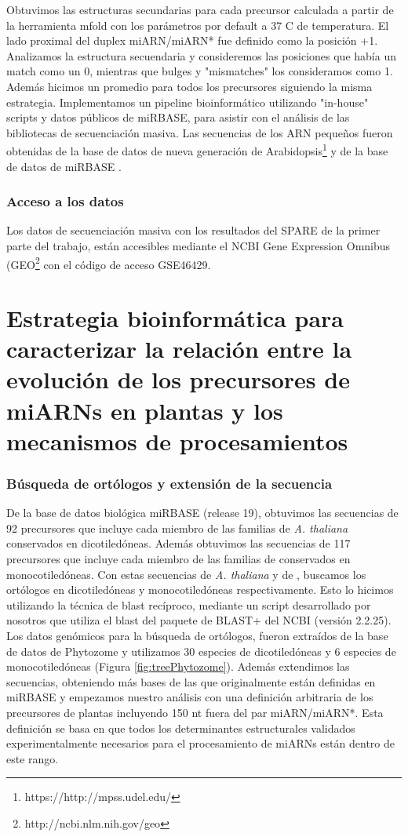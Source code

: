 Obtuvimos las estructuras secundarias para cada precursor calculada a partir de la herramienta mfold \citep{pmid12824337} con los parámetros por default a 37 \degree C de temperatura.
El lado proximal del duplex miARN/miARN* fue definido como la posición +1.
Analizamos la estructura secuendaria y consideremos las posiciones que había un match como un 0, mientras que bulges y "mismatches" los consideramos como 1.
Además hicimos un promedio para todos los precursores siguiendo la misma estrategia.
Implementamos un pipeline bioinformático utilizando "in-house" scripts y datos públicos de miRBASE, para asistir con el análisis de las bibliotecas de secuenciación masiva.
Las secuencias de los ARN pequeños fueron obtenidas de la base de datos de nueva generación de Arabidopsis\footnote{https://http://mpss.udel.edu/} \citep{pmid25120269} y  de la base de datos de miRBASE \citep{Kozomara2014}.

\subsubsection{Acceso a los datos}
Los datos de secuenciación masiva con los resultados del SPARE de la primer parte del trabajo, están accesibles mediante el NCBI Gene Expression Omnibus (GEO\footnote{http://ncbi.nlm.nih.gov/geo} con el código de acceso GSE46429.

\section{Estrategia bioinformática para caracterizar la relación entre la evolución de los precursores de miARNs en plantas y los mecanismos de procesamientos} \label{ref_evolution}

\subsubsection{Búsqueda de ortólogos y extensión de la secuencia}
De la base de datos biológica miRBASE (release 19), obtuvimos las secuencias de 92 precursores que incluye cada miembro de las familias de \textit{A. thaliana} conservados en dicotiledóneas.
Además obtuvimos las secuencias de 117 precursores que incluye cada miembro de las familias de  conservados en monocotiledóneas.
Con estas secuencias de \textit{A. thaliana} y de , buscamos los ortólogos en dicotiledóneas y monocotiledóneas respectivamente.
Esto lo hicimos utilizando la técnica de blast recíproco, mediante un script desarrollado por nosotros que utiliza el blast del paquete de BLAST+ del NCBI (versión 2.2.25).
Los datos genómicos para la búsqueda de ortólogos, fueron extraídos de la base de datos de Phytozome y utilizamos 30 especies de dicotiledóneas y 6 especies de monocotiledóneas (Figura \ref{fig:treePhytozome}).
Además extendimos las secuencias, obteniendo más bases de las que originalmente están definidas en miRBASE y empezamos nuestro análisis con una definición arbitraria de los precursores de plantas incluyendo 150 nt fuera del par miARN/miARN*.
Esta definición se basa en que todos los determinantes estructurales validados experimentalmente necesarios para el procesamiento de miARNs están dentro de este rango.

